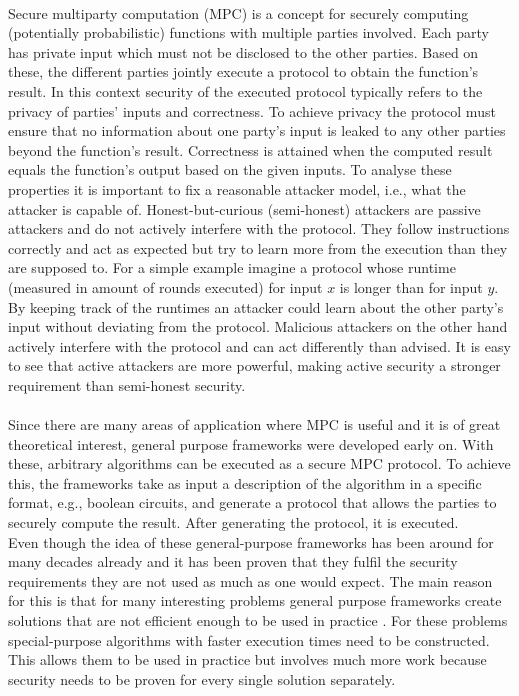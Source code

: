 \citeauthor{smas}\\
Secure multiparty computation (MPC) is a concept for securely computing (potentially probabilistic) functions with multiple parties involved. Each party has private input which must not be disclosed to the other parties. Based on these, the different parties jointly execute a protocol to obtain the function's result. In this context security of the executed protocol typically refers to the privacy of parties' inputs and correctness. To achieve privacy the protocol must ensure that no information about one party's input is leaked to any other parties beyond the function's result. Correctness is attained when the computed result equals the function's output based on the given inputs. To analyse these properties it is important to fix a reasonable attacker model, i.e., what the attacker is capable of. Honest-but-curious (semi-honest) attackers are passive attackers and do not actively interfere with the protocol. They follow instructions correctly and act as expected but try to learn more from the execution than they are supposed to. For a simple example imagine a protocol whose runtime (measured in amount of rounds executed) for input $x$ is longer than for input $y$. By keeping track of the runtimes an attacker could learn about the other party's input without deviating from the protocol. Malicious attackers on the other hand actively interfere with the protocol and can act differently than advised. It is easy to see that active attackers are more powerful, making active security a stronger requirement than semi-honest security.\\
\ \\Since there are many areas of application where MPC is useful and it is of great theoretical interest, general purpose frameworks were developed early on. With these, arbitrary algorithms can be executed as a secure MPC protocol. To achieve this, the frameworks take as input a description of the algorithm in a specific format, e.g., boolean circuits, and generate a protocol that allows the parties to securely compute the result. After generating the protocol, it is executed.\\ 
Even though the idea of these general-purpose frameworks has been around for many decades already and it has been proven that they fulfil the security requirements they are not used as much as one would expect. The main reason for this is that for many interesting problems general purpose frameworks create solutions that are not efficient enough to be used in practice \citep{sok, mpusp, htpamg, htgaes}. For these problems special-purpose algorithms with faster execution times need to be constructed. This allows them to be used in practice but involves much more work because security needs to be proven for every single solution separately. \\
